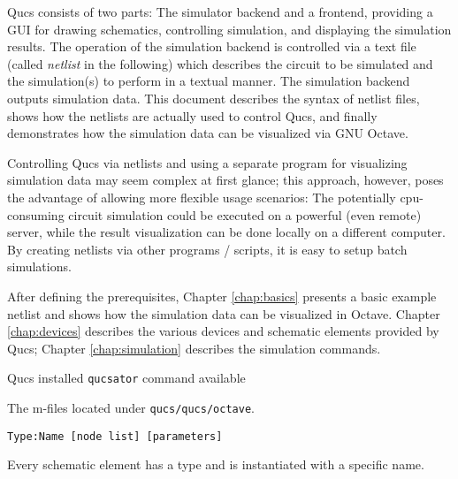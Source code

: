 %
%
%
%



Qucs consists of two parts: The simulator backend and a frontend, providing a GUI for drawing schematics, controlling simulation, and displaying the simulation results. The operation of the simulation backend is controlled via a text file (called \emph{netlist} in the following) which describes the circuit to be simulated and the simulation(s) to perform in a textual manner. The simulation backend outputs simulation data. This document describes the syntax of netlist files, shows how the netlists are actually used to control Qucs, and finally demonstrates how the simulation data can be visualized via GNU Octave.

Controlling Qucs via netlists and using a separate program for visualizing simulation data may seem complex at first glance; this approach, however, poses the advantage of allowing more flexible usage scenarios: The potentially cpu-consuming circuit simulation could be executed on a powerful (even remote) server, while the result visualization can be done locally on a different computer. By creating netlists via other programs / scripts, it is easy to setup batch simulations.



After defining the prerequisites, Chapter \ref{chap:basics} presents a basic example netlist and shows how the simulation data can be visualized in Octave. Chapter \ref{chap:devices} describes the various devices and schematic elements provided by Qucs; Chapter \ref{chap:simulation} describes the simulation commands.


\label{chap:basics}

Qucs installed \verb+qucsator+ command available

The m-files located under \verb+qucs/qucs/octave+.

\begin{verbatim}
Type:Name [node list] [parameters]
\end{verbatim}

Every schematic element has a type and is instantiated with a specific name.


